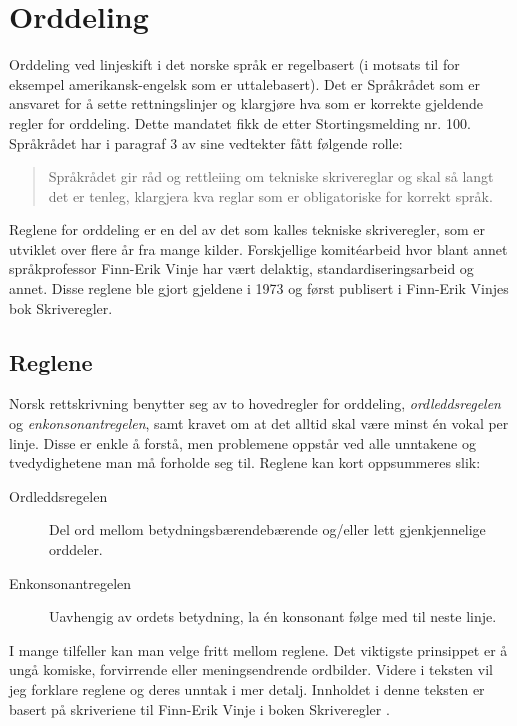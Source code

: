 \chapter{Orddeling}
\label{sec:orddeling}

Orddeling ved linjeskift i det norske språk er regelbasert (i motsats til for eksempel amerikansk-engelsk som er uttalebasert). Det er Språkrådet som er ansvaret for å sette rettningslinjer og klargjøre hva som er korrekte gjeldende regler for orddeling. Dette mandatet fikk de etter Stortingsmelding nr. 100. Språkrådet har i paragraf 3 av sine vedtekter fått følgende rolle:

\begin{quote}
Språkrådet gir råd og rettleiing om tekniske skrivereglar og skal så langt det er tenleg, klargjera kva reglar som er obligatoriske for korrekt språk.
\end{quote}

Reglene for orddeling er en del av det som kalles tekniske skriveregler, som er utviklet over flere år fra mange kilder. Forskjellige komitéarbeid hvor blant annet språkprofessor Finn-Erik Vinje har vært delaktig, standardiseringsarbeid og annet.\cite{Simonsen2015} Disse reglene ble gjort gjeldene i 1973 og først publisert i Finn-Erik Vinjes bok Skriveregler. 

\section{Reglene}
\label{sec:orddelingsreglene}

Norsk rettskrivning benytter seg av to hovedregler for orddeling, \textit{ordleddsregelen} og \textit{enkonsonantregelen}, samt kravet om at det alltid skal være minst én vokal per linje. Disse er enkle å forstå, men problemene oppstår ved alle unntakene og tvedydighetene man må forholde seg til. Reglene kan kort oppsummeres slik:

\begin{description}
	\item[Ordleddsregelen] Del ord mellom betydningsbærendebærende og/eller lett gjenkjennelige orddeler.
	\item[Enkonsonantregelen] Uavhengig av ordets betydning, la én konsonant følge med til neste linje.
\end{description}

I mange tilfeller kan man velge fritt mellom reglene. Det viktigste prinsippet er å ungå komiske, forvirrende eller meningsendrende ordbilder. Videre i teksten vil jeg forklare reglene og deres unntak i mer detalj. Innholdet i denne teksten er basert på skriveriene til Finn-Erik Vinje i boken Skriveregler \cite{vinje}.

